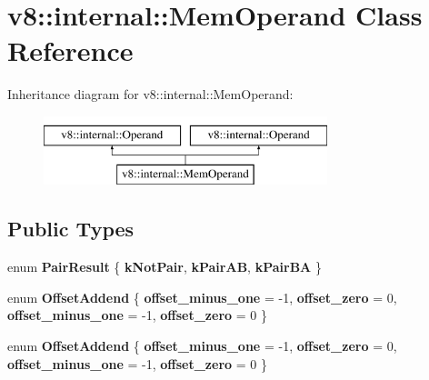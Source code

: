 \hypertarget{classv8_1_1internal_1_1MemOperand}{}\section{v8\+:\+:internal\+:\+:Mem\+Operand Class Reference}
\label{classv8_1_1internal_1_1MemOperand}
Inheritance diagram for v8\+:\+:internal\+:\+:Mem\+Operand\+:\begin{figure}[H]
\begin{center}
\leavevmode
\includegraphics[height=2.000000cm]{classv8_1_1internal_1_1MemOperand}
\end{center}
\end{figure}
\subsection*{Public Types}
\begin{DoxyCompactItemize}
\item 
\mbox{\label{classv8_1_1internal_1_1MemOperand_a39c608c01e6307073154d984c757a072}} 
enum {\bfseries Pair\+Result} \{ {\bfseries k\+Not\+Pair}, 
{\bfseries k\+Pair\+AB}, 
{\bfseries k\+Pair\+BA}
 \}
\item 
\mbox{\label{classv8_1_1internal_1_1MemOperand_ae497a6efbe9a0c02dd8ba0f2428f1bc8}} 
enum {\bfseries Offset\+Addend} \{ {\bfseries offset\+\_\+minus\+\_\+one} = -\/1, 
{\bfseries offset\+\_\+zero} = 0, 
{\bfseries offset\+\_\+minus\+\_\+one} = -\/1, 
{\bfseries offset\+\_\+zero} = 0
 \}
\item 
\mbox{\label{classv8_1_1internal_1_1MemOperand_ae497a6efbe9a0c02dd8ba0f2428f1bc8}} 
enum {\bfseries Offset\+Addend} \{ {\bfseries offset\+\_\+minus\+\_\+one} = -\/1, 
{\bfseries offset\+\_\+zero} = 0, 
{\bfseries offset\+\_\+minus\+\_\+one} = -\/1, 
{\bfseries offset\+\_\+zero} = 0
 \}
\end{DoxyCompactItemize}
